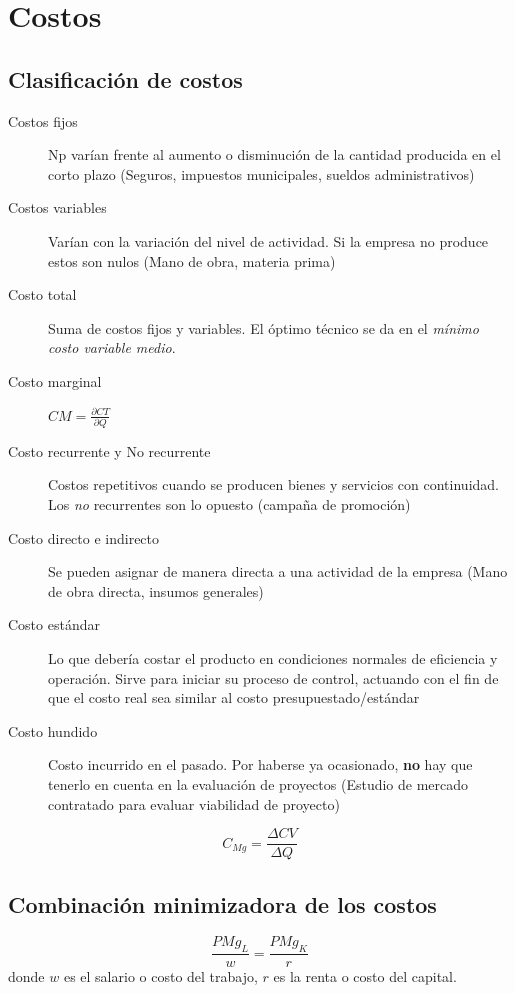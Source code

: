 \documentclass[twocolumn,10pt]{article}
\begin{document}
\section{Costos}

\subsection{Clasificaci\'on de costos}

\begin{description}
	\item[Costos fijos] Np var\'ian frente al aumento o disminuci\'on de la cantidad producida en el corto plazo (Seguros, impuestos municipales, sueldos administrativos)
	\item[Costos variables] Varían con la variación del nivel de actividad. Si la empresa no produce estos son nulos (Mano de obra, materia prima)
	\item[Costo total] Suma de costos fijos y variables. El óptimo técnico se da en el \textit{mínimo costo variable medio}.
	\item[Costo marginal] $CM = \frac{\partial CT}{\partial Q}$
	\item[Costo recurrente y No recurrente] Costos repetitivos cuando se producen bienes y servicios con continuidad. Los \textit{no} recurrentes son lo opuesto (campaña de promoción)
	\item[Costo directo e indirecto] Se pueden asignar de manera directa a una actividad de la empresa (Mano de obra directa, insumos generales)
	\item[Costo estándar] Lo que debería costar el producto en condiciones normales de eficiencia y operación. Sirve para iniciar su proceso de control, actuando con el fin de que el costo real sea similar al costo presupuestado/estándar
	\item[Costo hundido] Costo incurrido en el pasado. Por haberse ya ocasionado, \textbf{no} hay que tenerlo en cuenta en la evaluación de proyectos (Estudio de mercado contratado para evaluar viabilidad de proyecto)
\end{description}

\[
C_{Mg} = \frac{\Delta CV}{\Delta Q}
\]

\subsection{Combinación minimizadora de los costos}


\[
\frac{P {Mg_L}}{w} = \frac{P {Mg_K}}{r}
\]
donde $w$ es el salario o costo del trabajo, $r$ es la renta o costo del capital.
\end{document}
